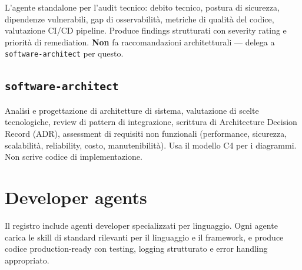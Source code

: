 \documentclass[12pt,a4paper,twoside]{book}
\begin{document}
L'agente standalone per l'audit tecnico: debito tecnico, postura di sicurezza, dipendenze vulnerabili, gap di osservabilità, metriche di qualità del codice, valutazione CI/CD pipeline. Produce findings strutturati con severity rating e priorità di remediation. \textbf{Non} fa raccomandazioni architetturali — delega a \texttt{software-architect} per questo.

\section{\texttt{software-architect}}

Analisi e progettazione di architetture di sistema, valutazione di scelte tecnologiche, review di pattern di integrazione, scrittura di Architecture Decision Record (ADR), assessment di requisiti non funzionali (performance, sicurezza, scalabilità, reliability, costo, manutenibilità). Usa il modello C4 per i diagrammi. Non scrive codice di implementazione.

\chapter{Developer agents}

Il registro include agenti developer specializzati per linguaggio. Ogni agente carica le skill di standard rilevanti per il linguaggio e il framework, e produce codice production-ready con testing, logging strutturato e error handling appropriato.
\end{document}
